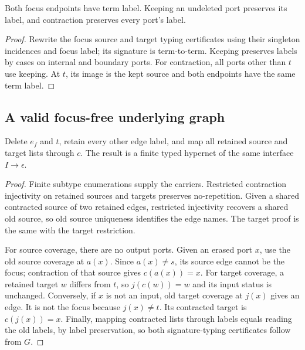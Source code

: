 \begin{lemma}
Both focus endpoints have term label. Keeping an undeleted port preserves its
label, and contraction preserves every port's label.
\end{lemma}
\begin{proof}
Rewrite the focus source and target typing certificates using their singleton
incidences and focus label; its signature is term-to-term. Keeping preserves
labels by cases on internal and boundary ports. For contraction, all ports
other than $t$ use keeping. At $t$, its image is the kept source and both
endpoints have the same term label.
\end{proof}

\subsection{A valid focus-free underlying graph}
\begin{theorem}
Delete $e_f$ and $t$, retain every other edge label, and map all retained source
and target lists through $c$. The result is a finite typed hypernet of the same
interface $I\to\epsilon$.
\end{theorem}
\begin{proof}
Finite subtype enumerations supply the carriers. Restricted contraction
injectivity on retained sources and targets preserves no-repetition. Given a
shared contracted source of two retained edges, restricted injectivity recovers
a shared old source, so old source uniqueness identifies the edge names.
The target proof is the same with the target restriction.

For source coverage, there are no output ports. Given an erased port $x$, use
the old source coverage at $a(x)$. Since $a(x)\ne s$, its source edge cannot be
the focus; contraction of that source gives $c(a(x))=x$.
For target coverage, a retained target $w$ differs from $t$, so
$j(c(w))=w$ and its input status is unchanged. Conversely, if $x$ is not an
input, old target coverage at $j(x)$ gives an edge. It is not the focus because
$j(x)\ne t$. Its contracted target is $c(j(x))=x$.
Finally, mapping contracted lists through labels equals reading the old labels,
by label preservation, so both signature-typing certificates follow from $G$.
\end{proof}

